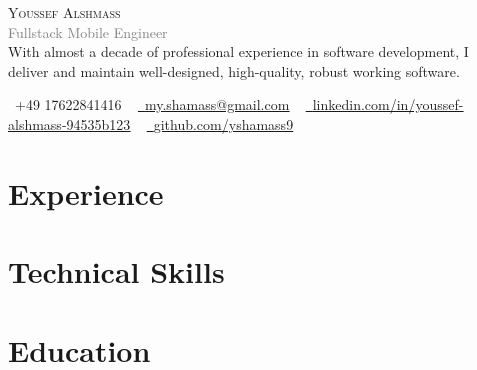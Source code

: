\documentclass[letterpaper,11pt]{article}
\newcommand{\resumeSubHeadingListStart}{\begin{itemize}[leftmargin=0.0in, label={}]}
\newcommand{\resumeSubHeadingListEnd}{\end{itemize}}
\begin{document}

{\Huge \scshape Youssef Alshmass} \\ \vspace{1pt}
\textcolor{Gray}{Fullstack Mobile Engineer} \\ \vspace{4pt} %
 With almost a decade of professional experience in software development, I deliver and maintain well-designed, high-quality, robust working software. \\ \vspace{8pt}

\vspace{8pt}
\small \raisebox{-0.1\height}\faPhone\ +49 17622841416 ~ \href{mailto:my.shamass@gmail.com}{\raisebox{-0.2\height}\faEnvelope\  \underline{my.shamass@gmail.com}} ~ 
\href{https://www.linkedin.com/in/youssef-alshmass-94535b123/}{\raisebox{-0.2\height}\faLinkedin\ \underline{linkedin.com/in/youssef-alshmass-94535b123}}  ~
\href{https://github.com/yshamass9}{\raisebox{-0.2\height}\faGithub\ \underline{github.com/yshamass9}}

\section{Experience}
  \resumeSubHeadingListStart
  
     
    
    
    
    
  \resumeSubHeadingListEnd
\vspace{-16pt}

\section{Technical Skills}
 \begin{itemize}[leftmargin=0.15in, label={}]
    
 \end{itemize}
 \vspace{-16pt}

\section{Education}
  \resumeSubHeadingListStart
    
  \resumeSubHeadingListEnd

% 


% 
\end{document}
